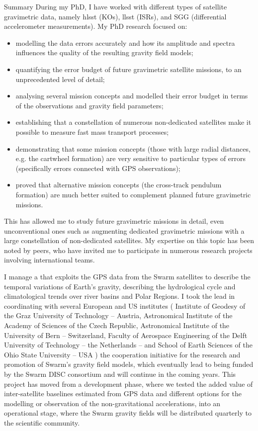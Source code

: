 \begin{cvtext}{Summary}
During my PhD, I have worked with different types of satellite gravimetric data, namely \acl{hlsst} (\aclp{KO}), \acl{llsst} (\aclp{ISR}), and \acl{SGG} (differential accelerometer measurements).
My PhD research focused on:
\begin{itemize}[topsep=0pt,itemsep=1pt,parsep=0pt,partopsep=0pt]
\item modelling the data errors accurately and how its amplitude and spectra influences the quality of the resulting gravity field models;
\item quantifying the error budget of future gravimetric satellite missions, to an unprecedented level of detail;
\item analysing several mission concepts and modelled their error budget in terms of the observations and gravity field parameters;
\item establishing that a constellation of numerous non-dedicated satellites make it possible to measure fast mass transport processes;
\item demonstrating that some mission concepts (those with large radial distances, \acs{e.g.} the cartwheel formation) are very sensitive to particular types of errors (specifically errors connected with \ac{GPS} observations); %
\item proved that alternative mission concepts (the cross-track pendulum formation) are much better suited to complement planned future gravimetric missions.%
\end{itemize}
This has allowed me to study future gravimetric missions in detail, even unconventional ones such as augmenting dedicated gravimetric missions with a large constellation of non-dedicated satellites.
My expertise on this topic has been noted by peers, who have invited me to participate in numerous research projects involving international teams.

I manage a  that exploits the \ac{GPS} data from the Swarm satellites to describe the temporal variations of Earth's gravity, describing the hydrological cycle and climatological trends over river basins and Polar Regions.
I took the lead in coordinating with several European and US institutes (%
Institute of Geodesy of the Graz University of Technology -- Austria,
Astronomical Institute of the Academy of Sciences of the Czech Republic, 
Astronomical Institute of the University of Bern -- Switzerland, 
Faculty of Aerospace Engineering of the Delft University of Technology -- the Netherlands -- and 
School of Earth Sciences of the Ohio State University -- USA%
) the cooperation initiative for the research and promotion of Swarm's gravity field models, which eventually lead to being funded by the Swarm \ac{DISC} consortium and will continue in the coming years.
This project has moved from a development phase, where we tested the added value of inter-satellite baselines estimated from GPS data and different options for the modelling or observation of the non-gravitational accelerations, into an operational stage, where the Swarm gravity fields will be distributed quarterly to the scientific community.


\end{cvtext}
